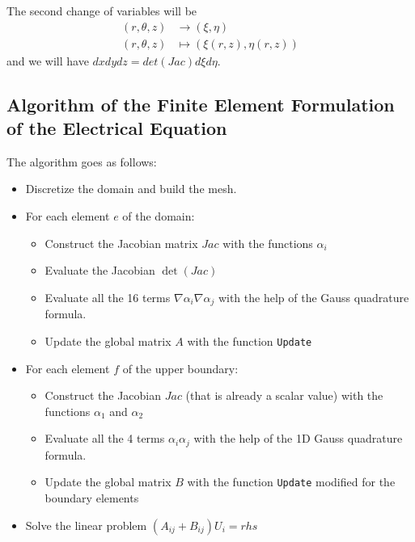 The second change of variables will be 
\begin{align}\label{change3}
(r,\theta,z)&\to(\xi,\eta)\\
(r,\theta,z)&\mapsto(\xi(r,z),\eta(r,z))\nonumber
\end{align}
and we will have $ dxdydz=det(Jac)d\xi d\eta $.
\subsection{Algorithm of the Finite Element Formulation of the Electrical Equation}
\begin{mdframed}
	The algorithm goes as follows:
	\begin{itemize}
		\item Discretize the domain and build the mesh.
		\item For each element $ e $ of the domain:
		\begin{itemize}
			\item Construct the Jacobian matrix $ Jac $ with the functions $ \alpha_i $
			\item Evaluate the Jacobian $ \det(Jac) $
			\item Evaluate all the 16 terms $ \nabla\alpha_i\nabla\alpha_j $ with the help of the Gauss quadrature formula.
			\item Update the global matrix $ A $ with the function \texttt{Update}
		\end{itemize}
		\item For each element $ f $ of the upper boundary:
		\begin{itemize}
			\item Construct the Jacobian $ Jac $ (that is already a scalar value) with the functions $ \alpha_1 $ and $ \alpha_2 $
			\item Evaluate all the 4 terms $ \alpha_i\alpha_j $ with the help of the 1D Gauss quadrature formula.
			\item Update the global matrix $ B $ with the function \texttt{Update} modified for the boundary elements
		\end{itemize}
		\item Solve the linear problem $ (A_{ij}+B_{ij})U_i = rhs $
	\end{itemize}
\end{mdframed}



